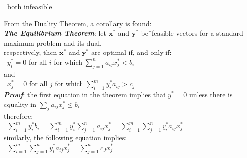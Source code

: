 \documentclass[10pt,letterpaper]{scrartcl}
\newcommand{\boph}[1]{\emph{\textbf{#1}}} %
\newcommand{\tbul}{\textbullet}
\begin{document}
\begin{tabbing}
\tbul\ both infeasible \\
\begin{tabbing}
From the Duality Theorem, a corollary is found: \\
\boph{The Equilibrium Theorem}: let $\mathbf{x^{*}}$ and $\mathbf{y^{*}}$ be\=\ feasible vectors for a standard maximum problem and its dual, \\ respectively, then $\mathbf{x^{*}}$ and $\mathbf{y^{*}}$ are optimal if, and only if: \\
\>\ $y^{*}_i = 0$ for all $i$ for which $\displaystyle\sum_{j=1}^{n}a_{ij}x^{*}_j < b_i$ \\
and \\
\>\ $x^{*}_j = 0$ for all $j$ for which $\displaystyle\sum_{i=1}^{m}y^{*}_ia_{ij} > c_j$  \\
\boph{Proof}: the first equation in the theorem implies that $y^{*}=0$ unless there is equality in $\displaystyle\sum_j a_{ij}x^{*}_j\leq b_i$ \\
therefore: \\
\>\ $\displaystyle\sum_{i=1}^{m}y^{*}_{i}b_i = \sum_{i=1}^{m}y^{*}_i\sum_{j=1}^{n}a_{ij}x^{*}_j = \sum_{i=1}^{m}\sum_{j=1}^{n}y^{*}_ia_{ij}x^{*}_j$ \\
similarly, the following equation implies: \\
\>\ $\displaystyle\sum_{i=1}^m\sum_{j=1}^ny^*_ia_{ij}x^*_j=\sum_{j=1}^nc_Jx^*_j$ \\
\end{tabbing}


\end{tabbing}
\end{document}
